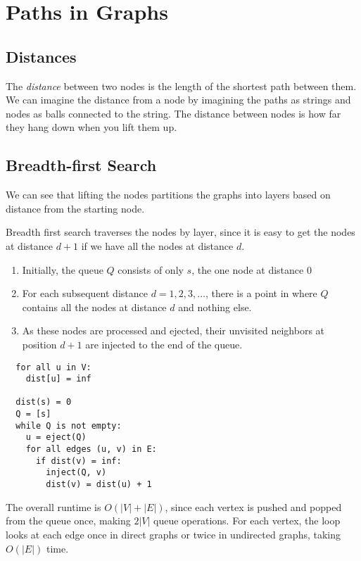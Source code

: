 \pagebreak

\section{Paths in Graphs}

\subsection{Distances}
The \textit{distance} between two nodes is the length of the shortest path between them.
We can imagine the distance from a node by imagining the paths as strings and nodes as balls connected to the string.
The distance between nodes is how far they hang down when you lift them up.

\subsection{Breadth-first Search}
We can see that lifting the nodes partitions the graphs into layers based on distance from the starting node.
\begin{definition}
Breadth first search traverses the nodes by layer, since it is easy to get the nodes at distance $d+1$ if we have all the nodes at distance $d$.
\begin{enumerate}
  \item{Initially, the queue $Q$ consists of only $s$, the one node at distance $0$}
  \item{For each subsequent distance $d = 1, 2, 3, \dots$, there is a point in where $Q$ contains all the nodes at distance $d$ and nothing else.}
  \item{As these nodes are processed and ejected, their unvisited neighbors at position $d+1$ are injected to the end of the queue.}
\end{enumerate}

\begin{verbatim}
  for all u in V:
    dist[u] = inf

  dist(s) = 0
  Q = [s]
  while Q is not empty:
    u = eject(Q)
    for all edges (u, v) in E:
      if dist(v) = inf:
        inject(Q, v)
        dist(v) = dist(u) + 1
\end{verbatim}
\end{definition}

The overall runtime is $O(|V| + |E|)$, since each vertex is pushed and popped from the queue once, making $2|V|$ queue operations.
For each vertex, the loop looks at each edge once in direct graphs or twice in undirected graphs, taking $O(|E|)$ time.

